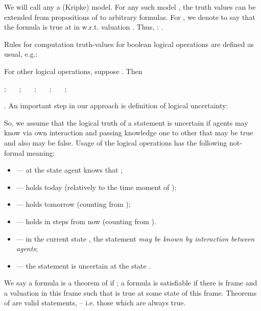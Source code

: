 \documentclass[runningheads]{llncs}
\begin{document}
  We will call any
 a (Kripke) model.
 For any such model , the truth values can be extended from
propositions of  to arbitrary formulas.
 For , we denote
 to say that the formula  is true at  in
 w.r.t. valuation . Thus, :
.



Rules for computation truth-values for  boolean logical operations
are defined as usual, e.g.:

 

For other logical operations, suppose . Then

    ;
\ \ \
    ;
\ \ \   
         ;
      \ \ \
;
\ \ \
;
\ \ \
        
   .
An important step in our approach is definition of logical uncertainty:




So, we assume that the logical truth of a statement  is uncertain if agents may know via
own interaction and passing knowledge one to other that  may be true and also  may be false.
Usage of the logical operations has the following not-formal meaning:
\begin{itemize}
    \item
  --- at the state 
 agent  knows that ;
  \medskip
    \item
  ---
   holds today (relatively to the time moment of );
  \medskip
    \item
  ---
   holds tomorrow (counting from );
  \medskip
    \item
  ---
   holds in  steps from now (counting from  ).

  \item \vspace*{0.3cm}
 --- in the current state , the statement
 {\it may be
known by interaction between agents};
\item \vspace*{0.3cm}
 --- the statement  is uncertain at the state .
\end{itemize}

\begin{definition}

\end{definition}

\medskip

We say a formula  is a theorem of  if ; a formula  is satisfiable if
there is frame and a valuation in this frame such that  is true at some state of this frame.
Theorems of  are valid statements, -- i.e. those which are always true.

          \medskip
\end{document}
